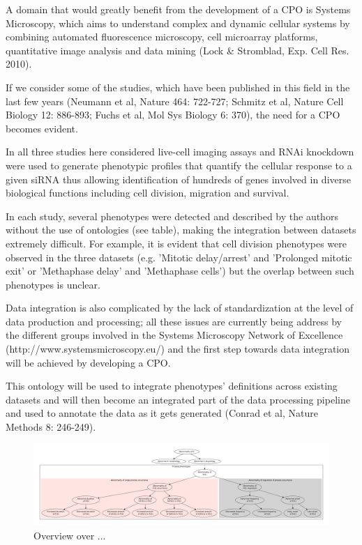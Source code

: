 \documentclass{bioinfo}
\begin{document}
A domain that would greatly benefit from the development of a CPO is
Systems Microscopy, which aims to understand complex and dynamic
cellular systems by combining automated fluorescence microscopy, cell
microarray platforms, quantitative image analysis and data mining
(Lock \& Stromblad, Exp. Cell Res. 2010).

If we consider some of the studies, which have been published in this
field in the last few years (Neumann et al, Nature 464: 722-727;
Schmitz et al, Nature Cell Biology 12: 886-893; Fuchs et al, Mol Sys
Biology 6: 370), the need for a CPO becomes evident.

In all three studies here considered live-cell imaging assays and RNAi
knockdown were used to generate phenotypic profiles that quantify the
cellular response to a given siRNA thus allowing identification of
hundreds of genes involved in diverse biological functions including
cell division, migration and survival.

In each study, several phenotypes were detected and described by the
authors without the use of ontologies (see table), making the
integration between datasets extremely difficult. For example, it is
evident that cell division phenotypes were observed in the three
datasets (e.g. 'Mitotic delay/arrest' and 'Prolonged mitotic exit' or
'Methaphase delay' and 'Methaphase cells') but the overlap between
such phenotypes is unclear.

Data integration is also complicated by the lack of standardization at
the level of data production and processing; all these issues are
currently being address by the different groups involved in the
Systems Microscopy Network of Excellence
(http://www.systemsmicroscopy.eu/) and the first step towards data
integration will be achieved by developing a CPO.

This ontology will be used to integrate phenotypes' definitions across
existing datasets and will then become an integrated part of the data
processing pipeline and used to annotate the data as it gets generated
(Conrad et al, Nature Methods 8: 246-249).

\begin{figure}[h]
  \centering
  \includegraphics[width=\textwidth,
  height=.33\textheight]{overview.pdf}
  \caption{Overview over ...\label{fig:overview}}
\end{figure}
\end{document}
